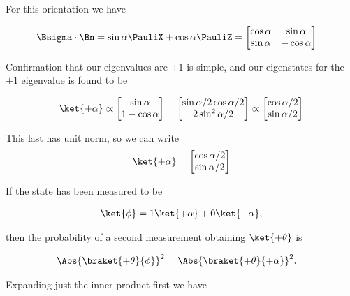 For this orientation we have

\begin{align}\label{eqn:boostCommutator:502}
\Bsigma \cdot \Bn
&=
\sin\alpha \PauliX + \cos\alpha \PauliZ
=
\begin{bmatrix}
\cos\alpha & \sin\alpha \\
\sin\alpha & -\cos\alpha
\end{bmatrix}
\end{align}

Confirmation that our eigenvalues are $\pm 1$ is simple, and our eigenstates for the $+1$ eigenvalue is found to be

\begin{align}\label{eqn:boostCommutator:503}
\ket{+\alpha} \propto 
\begin{bmatrix}
\sin\alpha \\
1 - \cos\alpha
\end{bmatrix}
= 
\begin{bmatrix}
\sin\alpha/2 \cos\alpha/2 \\
2 \sin^2 \alpha/2
\end{bmatrix}
\propto
\begin{bmatrix}
\cos \alpha/2 \\
\sin\alpha/2 
\end{bmatrix}
\end{align}

This last has unit norm, so we can write
\begin{align}\label{eqn:boostCommutator:504}
\ket{+\alpha} =
\begin{bmatrix}
\cos \alpha/2 \\
\sin\alpha/2 
\end{bmatrix}
\end{align}

If the state has been measured to be

\begin{align}\label{eqn:boostCommutator:505}
\ket{\phi} = 1 \ket{+\alpha} + 0 \ket{-\alpha},
\end{align}

then the probability of a second measurement obtaining $\ket{+\theta}$ is

\begin{align}\label{eqn:boostCommutator:506}
\Abs{ \braket{+\theta}{\phi} }^2
&=
\Abs{ \braket{+\theta}{+\alpha} }^2 .
\end{align}

Expanding just the inner product first we have

